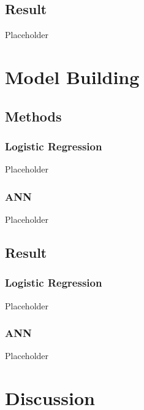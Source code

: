 \documentclass[letterpaper, 12 pt, conference]{ieeeconf}  %
\begin{document}
\subsection{Result}

Placeholder

\section{Model Building}
\subsection{Methods}
\subsubsection{Logistic Regression}
\mbox{} %

Placeholder

\subsubsection{ANN}
\mbox{} %

Placeholder

\subsection{Result}
\subsubsection{Logistic Regression}
\mbox{} %

Placeholder

\subsubsection{ANN}
\mbox{} %

Placeholder

\section{Discussion}
\end{document}
